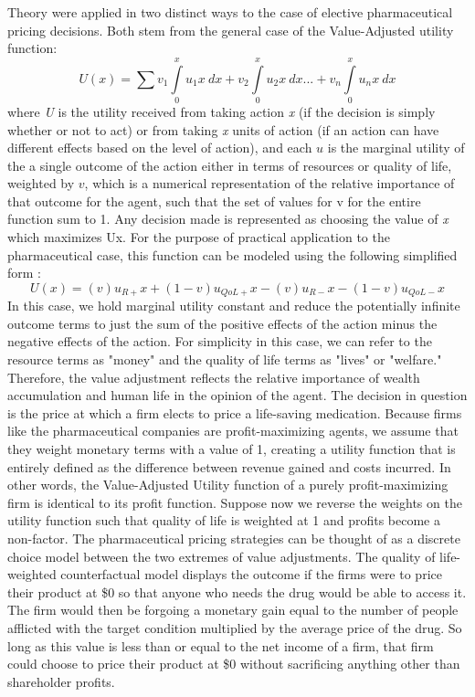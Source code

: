 \documentclass[12pt,english]{article} \usepackage{mathptmx}
\begin{document}
Theory were applied in two distinct ways to the case of elective 
pharmaceutical pricing decisions. Both stem from the general case of the 
Value-Adjusted utility function\cite{mozaffar20}: \begin{equation} U(x) 
= \sum {v_1\int\limits_0^x u_1x \ dx + v_2\int\limits_0^x u_2x \ dx ... 
+ v_n\int\limits_0^x u_nx \ dx }\end{equation} where \emph{U} is the 
utility received from taking action \emph{x} (if the decision is simply 
whether or not to act) or from taking \emph{x} units of action (if an 
action can have different effects based on the level of action), and 
each $u$ is the marginal utility of the a single outcome of the action 
either in terms of resources or quality of life, weighted by $v$, which 
is a numerical representation of the relative importance of that outcome 
for the agent, such that the set of values for v for the entire function 
sum to 1. Any decision made is represented as choosing the value of 
\emph{x} which maximizes U{x}. For the purpose of practical application 
to the pharmaceutical case, this function can be modeled using the 
following simplified form \cite{mozaffar20}: \begin{equation} U(x) = 
(v)u_{R+}x + (1-v)u_{QoL+}x- (v)u_{R-}x - (1-v)u_{QoL-}x\end{equation} 
In this case, we hold marginal utility constant and reduce the 
potentially infinite outcome terms to just the sum of the positive 
effects of the action minus the negative effects of the action. For 
simplicity in this case, we can refer to the resource terms as "money" 
and the quality of life terms as "lives" or "welfare." Therefore, the 
value adjustment reflects the relative importance of wealth accumulation 
and human life in the opinion of the agent. The decision in question is 
the price at which a firm elects to price a life-saving medication. 
Because firms like the pharmaceutical companies are profit-maximizing 
agents, we assume that they weight monetary terms with a value of 1, 
creating a utility function that is entirely defined as the difference 
between revenue gained and costs incurred. In other words, the 
Value-Adjusted Utility function of a purely profit-maximizing firm is 
identical to its profit function. Suppose now we reverse the weights on 
the utility function such that quality of life is weighted at 1 and 
profits become a non-factor. The pharmaceutical pricing strategies can 
be thought of as a discrete choice model between the two extremes of 
value adjustments. The quality of life-weighted counterfactual model 
displays the outcome if the firms were to price their product at \$0 so 
that anyone who needs the drug would be able to access it. The firm 
would then be forgoing a monetary gain equal to the number of people 
afflicted with the target condition multiplied by the average price of 
the drug. So long as this value is less than or equal to the net income 
of a firm, that firm could choose to price their product at \$0 without 
sacrificing anything other than shareholder profits.
 
\end{document}
